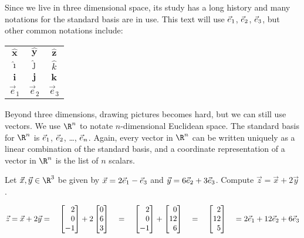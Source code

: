 Since we live in three dimensional space, its study has a long history and many notations
for the standard basis are in use. This text will use ${\vec e_1}$, ${\vec e_2}$, ${\vec e_3}$, but other common
notations include:
\begin{center}
	\begin{tabular}{c  c  c}
		$\hat{\mathbf{x}}$ & $\hat{\mathbf{y}}$ &$\hat{\mathbf{z}}$\\
		$\hat{\imath}$ & $\hat{\jmath}$ &$\hat{k}$\\
		$\mathbf{i}$ & $\mathbf j$ & $\mathbf k$\\
		$\vec e_1$ & $\vec e_2$ & $\vec e_3$
	\end{tabular}
\end{center}

Beyond three dimensions, drawing pictures becomes hard, but we can still use vectors.
We use $\R^n$ to notate $n$-dimensional Euclidean space. The standard basis for $\R^n$ is
$\vec { e}_{1}$, $\vec { e}_{2}$, \ldots, $\vec { e}_{n}$. Again, every vector in $\R^n$ can be written
uniquely as a linear combination of the standard basis, and a coordinate representation
of a vector in $\R^n$ is the list of $n$ scalars.

\begin{example}
	Let $\vec x,\vec y\in\R^3$ be given by $\vec x=2{\vec e_1}-{\vec e_3}$ and $\vec y=6{\vec e_2}+3{\vec e_3}$.
	Compute $\vec z=\vec x+2\vec y$.

	\[
		\vec z=\vec x+2\vec y=\quad\mat{2\\0\\-1}+2\mat{0\\6\\3}\quad
		=\quad\mat{2\\0\\-1}+\mat{0\\12\\6}\quad=\quad\mat{2\\12\\5}\quad=2\xhat+12\yhat+6\zhat
	\]
\end{example}
